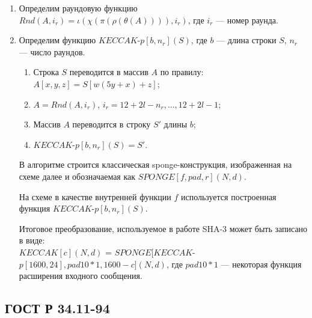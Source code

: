 \documentclass{./civarticle}
\begin{document}
\begin{enumerate}
    \item Определим раундовую функцию $Rnd(A, i_r) = \iota(\chi(\pi(\rho(\theta(A)))), i_r)$, где $i_r$ --- номер раунда.

    \item Определим функцию $KECCAK$-$p[b, n_r](S)$, где $b$ --- длина строки $S$, $n_r$ --- число раундов.

    \begin{enumerate}
        \item Строка $S$ переводится в массив $A$ по правилу: $A[x, y, z] = S[w(5y+x)+z]$;
        \item $A = Rnd(A, i_r)$, $i_r = 12 + 2l - n_r, ..., 12 + 2l - 1$;
        \item Массив $A$ переводится в строку $S'$ длины $b$;
        \item $KECCAK$-$p[b, n_r](S) = S'$. 
    \end{enumerate}
    

    В алгоритме строится классическая sponge-конструкция, изображенная на схеме далее и обозначаемая как $SPONGE[f, pad, r](N, d)$.
    
    \begin{figure}[h!]
    \end{figure}

    На схеме в качестве внутренней функции $f$ используется построенная функция $KECCAK$-$p[b, n_r](S)$.

    Итоговое преобразование, используемое в работе SHA-3 может быть записано в виде: \\ $KECCAK[c](N, d)$ = $SPONGE[KECCAK$-$p[1600, 24], pad10*1, 1600-c](N, d)$, где $pad10*1$ --- некоторая функция расширения входного сообщения.
    
\end{enumerate}


\subsection{ГОСТ Р 34.11-94}
\end{document}
